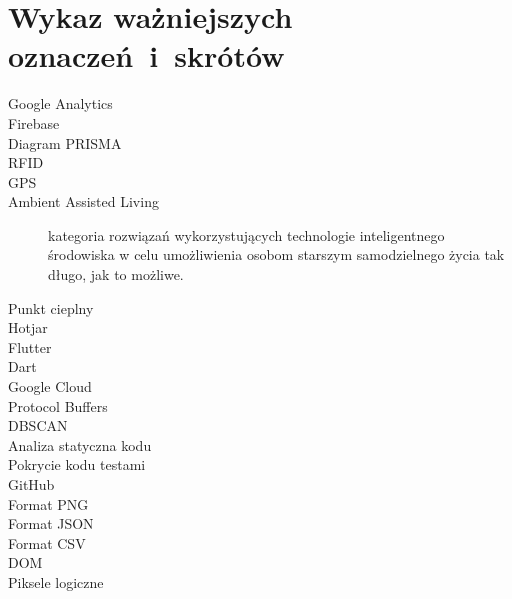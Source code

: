 \chapter*{Wykaz ważniejszych oznaczeń~i~skrótów}

\begin{description}
	\item [Google Analytics]
	\item [Firebase]
	\item [Diagram PRISMA]
	\item [RFID]
	\item [GPS]
	\item [Ambient Assisted Living] kategoria rozwiązań wykorzystujących technologie inteligentnego środowiska w celu umożliwienia osobom starszym samodzielnego życia tak długo, jak to możliwe.
	\item [Punkt cieplny]
	\item [Hotjar]
	\item [Flutter]
	\item [Dart]
	\item [Google Cloud]
	\item [Protocol Buffers]
	\item [DBSCAN]
	\item [Analiza statyczna kodu]
	\item [Pokrycie kodu testami]
	\item [GitHub]
	\item [Format PNG]
	\item [Format JSON]
	\item [Format CSV]
	\item [DOM]
	\item [Piksele logiczne]
\end{description}
